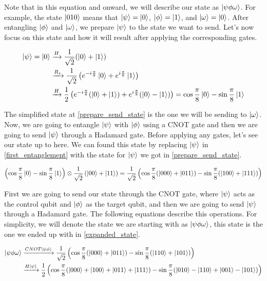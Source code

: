 \documentclass[]{article}
\newcommand\Hto{\xrightarrow{H}}
\newcommand\Htopsi{\xrightarrow{H\ket{\psi}}}
\newcommand\Rzto{\xrightarrow{R_z}}
\newcommand\Cnot{\xrightarrow{CNOT\ket{\psi\phi}}}
\begin{document}
Note that in this equation and onward, we will describe our state as $\ket{\psi\phi\omega}$. For example, the state $\ket{010}$ means that $\ket{\psi} = \ket{0}$, $\ket{\phi} = \ket{1}$, and $\ket{\omega} = \ket{0}$. After entangling $\ket{\phi}$ and $\ket{\omega}$, we prepare $\ket{\psi}$ to the state we want to send. Let's now focus on this state and how it will result after applying the corresponding gates. 

\begin{align}
    \ket{\psi} = \ket{0} &\Hto \frac{1}{\sqrt{2}}(\ket{0} + \ket{1}) \\
    &\Rzto{}  \frac{1}{\sqrt{2}}\left(e^{-i\frac{\pi}{8}}\ket{0} + e^{i\frac{\pi}{8}}\ket{1}\right) \\ 
    &\Hto{} \frac{1}{2}\left(e^{-i\frac{\pi}{8}}(\ket{0} + \ket{1}) + e^{i\frac{\pi}{8}}(\ket{0}-\ket{1})\right) = \cos{\frac{\pi}{8}}\ket{0} - \sin{\frac{\pi}{8}}\ket{1} \label{prepare_send_state}
\end{align}

The simplified state at \eqref{prepare_send_state} is the one we will be sending to $\ket{\omega}$. Now, we are going to entangle $\ket{\psi}$ with $\ket{\phi}$ using a CNOT gate and then we are going to send $\ket{\psi}$ through a Hadamard gate. Before applying any gates, let's see our state up to here. We can found this state by replacing $\ket{\psi}$ in \eqref{first_entanglement} with the state for $\ket{\psi}$ we got in \eqref{prepare_send_state}. 

\begin{align} \label{expanded_state}
    \left(\cos{\frac{\pi}{8}}\ket{0} - \sin{\frac{\pi}{8}}\ket{1}\right) \otimes \frac{1}{\sqrt{2}}\left(\ket{00} + \ket{11}\right) = \frac{1}{\sqrt{2}}\left(\cos{\frac{\pi}{8}}(\ket{000} + \ket{011}) - \sin{\frac{\pi}{8}}(\ket{100} + \ket{111})\right)
\end{align}

First we are going to send our state through the CNOT gate, where $\ket{\psi}$ acts as the control qubit and $\ket{\phi}$ as the target qubit, and then we are going to send $\ket{\psi}$ through a Hadamard gate. The following equations describe this operations. For simplicity, we will denote the state we are starting with as $\ket{\psi\phi\omega}$, this state is the one we ended up with in \eqref{expanded_state}.

\begin{align}
     \ket{\psi\phi\omega} &\Cnot{} \frac{1}{\sqrt{2}}\left(\cos{\frac{\pi}{8}}(\ket{000} + \ket{011}) - \sin{\frac{\pi}{8}}(\ket{110} + \ket{101})\right) \\ 
     &\Htopsi{} \frac{1}{2}\left(\cos{\frac{\pi}{8}} (\ket{000} + \ket{100} + \ket{011} + \ket{111}) - \sin{\frac{\pi}{8}}(\ket{010} - \ket{110} + \ket{001} - \ket{101}) \right) \label{before_measuring}
\end{align}
\end{document}
